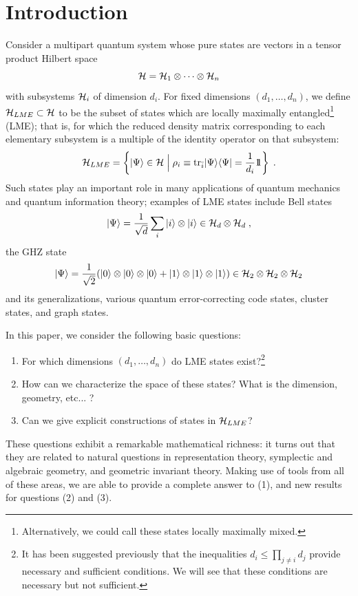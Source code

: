 \documentclass[12pt]{article}
\theoremstyle{definition}
\newcommand{\be}{\begin{equation}}
\newcommand{\ee}{\end{equation}}
\def\identity{{\rlap{1} \hskip 1.6pt \hbox{1}}}
\newcommand{\tr}{{\rm tr}}
\begin{document}
\section{Introduction}

Consider a multipart quantum system whose pure states are vectors in a tensor product Hilbert space
\[
{\cal H} = {\cal H}_{1} \otimes \cdots \otimes {\cal H}_{n} 
\]
with subsystems ${\cal H}_i$ of dimension $d_i$. For fixed dimensions $(d_1,\dots,d_n)$, we define ${\cal H}_{LME} \subset {\cal H}$ to be the subset of states which are locally maximally entangled\footnote{Alternatively, we could call these states locally maximally mixed.} (LME); that is, for which the reduced density matrix corresponding to each elementary subsystem is a multiple of the identity operator on that subsystem:
\be
{\cal H}_{LME} = \left\{|\Psi \rangle \in {\cal H} \; \Big| \; \rho_i \equiv \tr_{\bar{i}}|\Psi \rangle \langle \Psi | = {1 \over d_i} \identity \right\}\; .
\ee
Such states play an important role in many applications of quantum mechanics and quantum information theory; examples of LME states include Bell states
\be
\label{Bell}
|\Psi \rangle = {1 \over \sqrt{d}} \sum_{i} |i \rangle \otimes |i \rangle \in {\cal H}_d \otimes {\cal H}_d \; ,
\ee
the GHZ state
\be
\label{GHZ}
|\Psi \rangle = {1 \over \sqrt{2}} (|0 \rangle \otimes |0 \rangle \otimes |0 \rangle  + |1 \rangle \otimes |1 \rangle \otimes |1 \rangle) \in {\cal H}_2 \otimes {\cal H}_2 \otimes {\cal H}_2
\ee
and its generalizations, various quantum error-correcting code states, cluster states, and graph states.

In this paper, we consider the following basic questions:
\begin{enumerate}
\item
For which dimensions $(d_1,\dots,d_n)$ do LME states exist?\footnote{It has been suggested previously that the inequalities $d_i \le \prod_{j \ne i} d_j$ provide necessary and sufficient conditions. We will see that these conditions are necessary but not sufficient.}
\item
How can we characterize the space of these states? What is the dimension, geometry, etc... ?
\item
Can we give explicit constructions of states in ${\cal H}_{LME}$?
\end{enumerate}
These questions exhibit a remarkable mathematical richness: it turns out that they are related to natural questions in representation theory, symplectic and algebraic geometry, and geometric invariant theory. Making use of tools from all of these areas, we are able to provide a complete answer to (1), and new results for questions (2) and (3).
\end{document}
